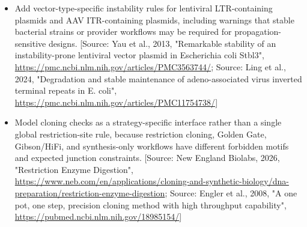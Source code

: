 \documentclass[11pt]{report}
\begin{document}
\begin{itemize}
\item Add vector-type-specific instability rules for lentiviral LTR-containing plasmids and AAV ITR-containing plasmids, including warnings that stable bacterial strains or provider workflows may be required for propagation-sensitive designs. [Source: Yau et al., 2013, "Remarkable stability of an instability-prone lentiviral vector plasmid in Escherichia coli Stbl3", \url{https://pmc.ncbi.nlm.nih.gov/articles/PMC3563744/}; Source: Ling et al., 2024, "Degradation and stable maintenance of adeno-associated virus inverted terminal repeats in E. coli", \url{https://pmc.ncbi.nlm.nih.gov/articles/PMC11754738/}]
\item Model cloning checks as a strategy-specific interface rather than a single global restriction-site rule, because restriction cloning, Golden Gate, Gibson/HiFi, and synthesis-only workflows have different forbidden motifs and expected junction constraints. [Source: New England Biolabs, 2026, "Restriction Enzyme Digestion", \url{https://www.neb.com/en/applications/cloning-and-synthetic-biology/dna-preparation/restriction-enzyme-digestion}; Source: Engler et al., 2008, "A one pot, one step, precision cloning method with high throughput capability", \url{https://pubmed.ncbi.nlm.nih.gov/18985154/}]
\end{itemize}
\end{document}
